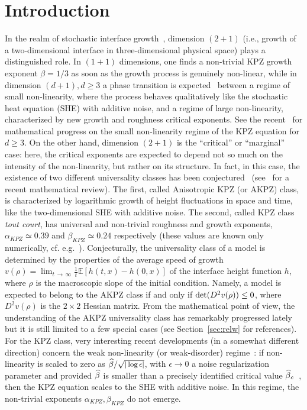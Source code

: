 \documentclass[10pt]{amsart}
\theoremstyle{definition}\newtheorem{defi}[theo]{Definition}\newtheorem{rema}[theo]{Remark}\newtheorem{exam}[theo]{Example}\newtheorem{exem}[theo]{Example}\newtheorem{nota}[theo]{Notation}
\newcommand{\bbE}{\mathbb{E}}
\let\oldhat\hat
\renewcommand*{\hat}[1]{\mathchoice{\widehat{#1}}{\widehat{#1}}{\oldhat{#1}}{\oldhat{#1}}}
\begin{document}
\section{Introduction}
In the realm of stochastic interface growth~\cite{BS95}, dimension $(2+1)$ (i.e., growth of a two-dimensional interface in three-dimensional physical space) plays a distinguished role. In $(1+1)$ dimensions, one finds a non-trivial KPZ growth exponent $\beta=1/3$ as soon as the growth process is genuinely non-linear, while in dimension $(d+1),d\ge3$ a phase transition is expected~\cite{KPZ86} between a regime of small non-linearity, where the process behaves qualitatively like the stochastic heat equation (SHE) with additive noise, and a regime of large non-linearity, characterized by new growth and roughness critical exponents. See the recent~\cite{comets2019renormalizing,dunlap2018fluctuations,magnen2018scaling} for mathematical progress on the small non-linearity regime of the KPZ equation for $d\ge3$. On the other hand, dimension $(2+1)$ is the ``critical'' or ``marginal'' case: here, the critical exponents are expected to depend not so much on the intensity of the non-linearity, but rather on its structure. In fact, in this case, the existence of two different universality classes has been conjectured~\cite{BS95,Wol91} (see~\cite{toninelli20173+} for a recent mathematical review). The first, called Anisotropic KPZ (or AKPZ) class, is characterized by logarithmic growth of height fluctuations in space and time, like the two-dimensional SHE with additive noise. The second, called KPZ class \emph{tout court}, has universal and non-trivial roughness and growth exponents, $\alpha_{KPZ}\simeq 0.39$ and $\beta_{KPZ}\simeq 0.24$ respectively (these values are known only numerically, cf. e.g.~\cite{HH12,TFW92}). Conjecturally, the universality class of a model is determined by the properties of the average speed of growth $v(\rho)=\lim_{t\,\to\,\infty}\frac1t\bbE[h(t,x)-h(0,x)]$ of the interface height function $h$, where $\rho$ is the macroscopic slope of the initial condition. Namely, a model is expected to belong to the AKPZ class if and only if $\det(D^2 v(\rho))\linebreak\le 0$, where $D^2 v(\rho)$ is the $2\times 2$ Hessian matrix. From the mathematical point of view, the understanding of the AKPZ universality class has remarkably progressed lately but it is still limited to a few special cases (see Section~\ref{sec:relw} for references). For the KPZ class, very interesting recent developments (in a somewhat different direction) concern the weak non-linearity (or weak-disorder) regime~\cite{chatterjee2018constructing,caravenna2018two}: if non-linearity is scaled to zero as $\hat \beta/\sqrt{\text{\small{$|\log\epsilon|$}}}$, with $\epsilon\to0$ a noise regularization parameter and provided $\hat \beta$ is smaller than a precisely identified critical value $\hat \beta_c$~\cite{caravenna2018two}, then the KPZ equation scales to the SHE with additive noise. In this regime, the non-trivial exponents $\alpha_{KPZ},\beta_{KPZ}$ do not emerge.
\end{document}
